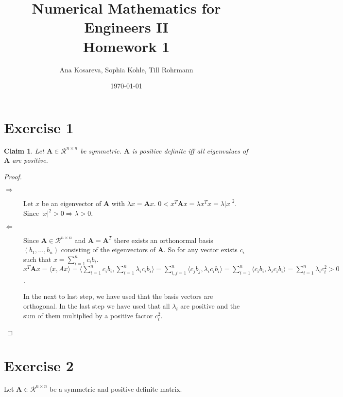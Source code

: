 \documentclass{article}
\title{Numerical Mathematics for Engineers II\\Homework 1}
\author{Ana Kosareva, Sophia Kohle, Till Rohrmann}
\date{\today}
\newtheorem{claim}{Claim}
\begin{document}
\maketitle

\section*{Exercise 1}
	\begin{claim}
		Let $\pmb A \in \mathcal{R}^{n\times n}$ be symmetric. $\pmb A$ is positive definite iff all eigenvalues of $\pmb A$ are positive.
	\end{claim}
	\begin{proof}
		\begin{description}
			\item[$\Rightarrow$] Let $x$ be an eigenvector of $\pmb A$ with $\lambda x = \pmb A x$. $0 < x^{T}\pmb A x = \lambda x^{T}x = \lambda |x|^{2}$. Since $|x|^{2} > 0 \Rightarrow \lambda > 0$.
			\item[$\Leftarrow$] Since $\pmb A \in \mathcal{R}^{n\times n}$ and $\pmb A = \pmb A^{T}$ there exists an orthonormal basis $(b_{1},\ldots, b_{n})$ consisting of the eigenvectors of $\pmb A$. So for any vector exists $c_{i}$ such that $x=\sum_{i=1}^{n}c_{i}b_{i}$. $x^{T}\pmb A x = \langle x,Ax \rangle = \langle \sum_{i=1}^{n}c_{i}b_{i},\sum_{i=1}^{n}\lambda_{i}c_{i}b_{i}\rangle = \sum_{i,j=1}^{n}\langle c_{j}b_{j}, \lambda_{i}c_{i}b_{i} \rangle = \sum_{i=1}^{n} \langle c_{i}b_{i},\lambda_{i}c_{i}b_{i}\rangle = \sum_{i=1}^{n} \lambda_{i} c_{i}^{2} > 0$.
			
			In the next to last step, we have used that the basis vectors are orthogonal. In the last step we have used that all $\lambda_{i}$ are positive and the sum of them multiplied by a positive factor $c_{i}^{2}$.
		\end{description}
	\end{proof}
	
\section*{Exercise 2}
	Let $\pmb A \in \mathcal{R}^{n\times n}$ be a symmetric and positive definite matrix.
\end{document}
